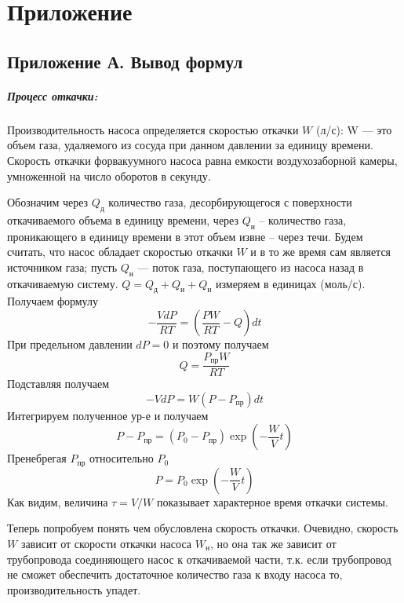 \chapter{Приложение}
\label{ch:appendix}

\section{Приложение А. Вывод формул}

\paragraph{Процесс откачки: }

Производительность насоса определяется скоростью откачки $W$ (л/с): W — это объем газа, удаляемого из сосуда при данном давлении за единицу времени. Скорость откачки форвакуумного насоса равна емкости воздухозаборной камеры, умноженной на число оборотов в секунду.

Обозначим через $Q_\text{д}$ количество газа, десорбирующегося с поверхности откачиваемого объема в единицу времени, через $Q_\text{и}$ -- количество газа, проникающего в единицу времени в этот объем извне -- через течи. Будем считать, что насос обладает скоростью откачки $W$ и в то же время сам является источником газа; пусть $Q_\text{н}$ — поток газа, поступающего из насоса назад в откачиваемую систему. $Q=Q_\text{д} + Q_\text{и} + Q_\text{н}$ измеряем в единицах (моль/с). Получаем формулу
\begin{equation*}
    -\frac{VdP}{RT}=\left(\frac{PW}{RT} - Q\right)dt
\end{equation*}
При предельном давлении $dP=0$ и поэтому получаем
\begin{equation*}
    Q=\frac{P_\text{пр}W}{RT}
\end{equation*}
Подставляя получаем
\begin{equation*}
    -VdP=W(P-P_\text{пр})dt
\end{equation*}
Интегрируем полученное ур-е и получаем
\begin{equation}
    P-P_\text{пр}=(P_0 - P_\text{пр})\exp\left(-\frac{W}{V}t\right)
\end{equation}
Пренебрегая $P_\text{пр}$ относительно $P_0$
\begin{equation}
    P=P_0\exp\left(-\frac{W}{V}t\right) \label{W}
\end{equation}
Как видим, величина $\tau=V/W$ показывает характерное время откачки системы.

Теперь попробуем понять чем обусловлена скорость откачки. Очевидно, скорость $W$ зависит от скорости откачки насоса $W_\text{н}$, но она так же зависит от трубопровода соединяющего насос к откачиваемой части, т.к. если трубопровод не сможет обеспечить достаточное количество газа к входу насоса то, производительность упадет.

